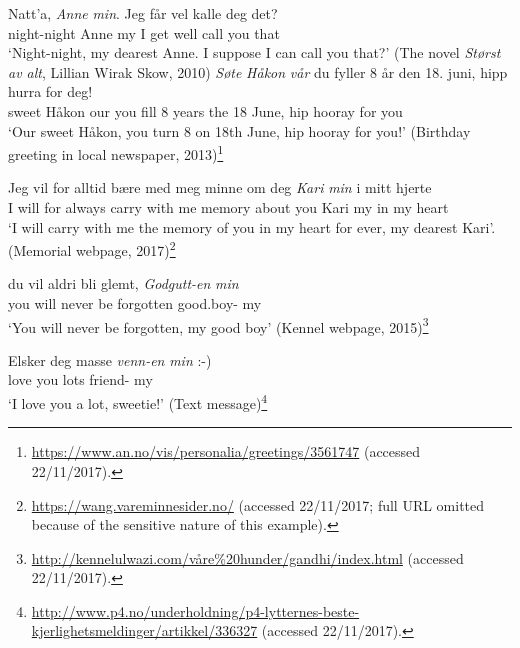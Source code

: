 \documentclass[output=paper]{langsci/langscibook}
\begin{document}
\ea\label{ex:affectiontepossessive}
	\ea
		\gll Natt'a, \textit{Anne} \textit{min}. Jeg f\aa{}r vel kalle deg det?\\
		night-night Anne my I get well call you that\\
		\glt `Night-night, my dearest Anne. I suppose I can call you that?' (The novel \emph{St\o{}rst av alt}, Lillian Wirak Skow, 2010)
		\ex
		\gll \textit{S\o{}te } \textit{H\aa{}kon} \textit{v\aa{}r} du fyller 8 \aa{}r den 18. juni, hipp hurra for deg!\\
		sweet H\aa{}kon our you fill 8 years the 18 June, hip hooray for you\\
	\glt `Our sweet H\aa{}kon, you turn 8 on  18th  June, hip hooray for you!'
    (Birthday greeting in local newspaper,
2013)\footnote{\url{https://www.an.no/vis/personalia/greetings/3561747} (accessed 22/11/2017).} %

		\ex

\gll Jeg vil for alltid b\ae{}re med meg minne om deg \textit{Kari} \textit{min} i mitt hjerte\\
I will for always carry with me memory about you Kari my in my heart\\
\glt `I will carry with me the memory of you in my heart for ever, my dearest
Kari'. (Memorial webpage, 2017)\footnote{\url{https://wang.vareminnesider.no/}
(accessed 22/11/2017; full URL omitted because of the sensitive nature of this
example).}

    \ex
\gll  [...] du vil aldri bli glemt, \textit{Godgutt-en} \textit{min}\\
{} you will never be forgotten good.boy-\Def{} my\\
\glt `You will never be forgotten, my good boy' (Kennel webpage,
2015)\footnote{\url{http://kennelulwazi.com/våre\%20hunder/gandhi/index.html} (accessed 22/11/2017).}

    \ex
\gll [...] Elsker deg masse \textit{venn-en} \textit{min} :-)\\
{} love you lots friend-\Def{} my\\
\glt `I love you a lot, sweetie!' (Text message)\footnote{\url{http://www.p4.no/underholdning/p4-lytternes-beste-kjerlighetsmeldinger/artikkel/336327} (accessed 22/11/2017).}

    \z
\z
\end{document}
